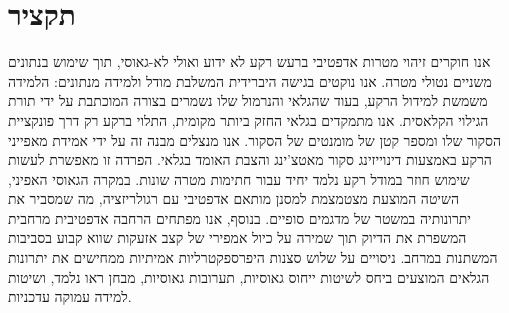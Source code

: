 \chapter*{תקציר}

אנו חוקרים זיהוי מטרות אדפטיבי ברעש רקע לא ידוע ואולי לא-גאוסי, תוך שימוש בנתונים משניים נטולי מטרה. אנו נוקטים בגישה היברידית המשלבת מודל ולמידה מנתונים: הלמידה משמשת למידול הרקע, בעוד שהגלאי והנרמול שלו נשמרים בצורה המוכתבת על ידי תורת הגילוי הקלאסית. אנו מתמקדים בגלאי החזק ביותר מקומית, התלוי ברקע רק דרך פונקציית הסקור שלו ומספר קטן של מומנטים של הסקור. אנו מנצלים מבנה זה על ידי אמידת מאפייני הרקע באמצעות דינוייזינג סקור מאטצ'ינג והצבת האומד בגלאי. הפרדה זו מאפשרת לעשות שימוש חוזר במודל רקע נלמד יחיד עבור חתימות מטרה שונות. במקרה הגאוסי האפיני, השיטה המוצעת מצטמצמת למסנן מותאם אדפטיבי עם רגולריזציה, מה שמסביר את יתרונותיה במשטר של מדגמים סופיים. בנוסף, אנו מפתחים הרחבה אדפטיבית מרחבית המשפרת את הדיוק תוך שמירה על כיול אמפירי של קצב אזעקות שווא קבוע בסביבות המשתנות במרחב. ניסויים על שלוש סצנות היפרספקטרליות אמיתיות ממחישים את יתרונות הגלאים המוצעים ביחס לשיטות ייחוס גאוסיות, תערובות גאוסיות, מבחן ראו נלמד, ושיטות למידה עמוקה עדכניות.
